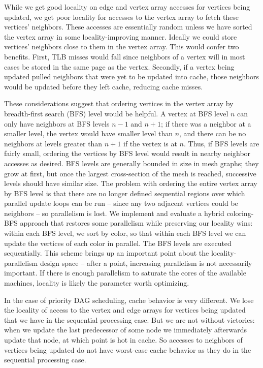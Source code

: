 \documentclass[journal]{IEEEtran}
\begin{document}
While we get good locality on edge and vertex array accesses for vertices being updated, we get poor locality for accesses to the vertex array to fetch these vertices' neighbors. These accesses are essentially random unless we have sorted the vertex array in some locality-improving manner. Ideally we could store vertices' neighbors close to them in the vertex array. This would confer two benefits. First, TLB misses would fall since neighbors of a vertex will in most cases be stored in the same page as the vertex. Secondly, if a vertex being updated pulled neighbors that were yet to be updated into cache, those neighbors would be updated before they left cache, reducing cache misses.

These considerations suggest that ordering vertices in the vertex array by breadth-first search (BFS) level would be helpful. A vertex at BFS level $n$ can only have neighbors at BFS levels $n-1$ and $n+1$; if there was a neighbor at a smaller level, the vertex would have smaller level than $n$, and there can be no neighbors at levels greater than $n+1$ if the vertex is at $n$. Thus, if BFS levels are fairly small, ordering the vertices by BFS level would result in nearby neighbor accesses as desired. BFS levels are generally bounded in size in mesh graphs; they grow at first, but once the largest cross-section of the mesh is reached, successive levels should have similar size. The problem with ordering the entire vertex array by BFS level is that there are no longer defined sequential regions over which parallel update loops can be run -- since any two adjacent vertices could be neighbors -- so parallelism is lost. We implement and evaluate a hybrid coloring-BFS approach that restores some parallelism while preserving our locality wins: within each BFS level, we sort by color, so that within each BFS level we can update the vertices of each color in parallel. The BFS levels are executed sequentially. This scheme brings up an important point about the locality-parallelism design space -- after a point, increasing parallelism is not necessarily important. If there is enough parallelism to saturate the cores of the available machines, locality is likely the parameter worth optimizing.

In the case of priority DAG scheduling, cache behavior is very different. We lose the locality of access to the vertex and edge arrays for vertices being updated that we have in the sequential processing case. But we are not without victories: when we update the last predecessor of some node we immediately afterwards update that node, at which point is hot in cache. So accesses to neighbors of vertices being updated do not have worst-case cache behavior as they do in the sequential processing case.
\end{document}
